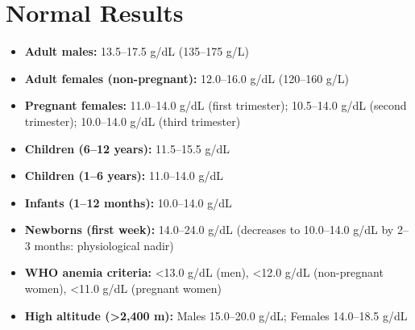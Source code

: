 \section*{Normal Results}
\begin{itemize}
  \item \textbf{Adult males:} 13.5--17.5 g/dL (135--175 g/L)
  \item \textbf{Adult females (non-pregnant):} 12.0--16.0 g/dL (120--160 g/L)
  \item \textbf{Pregnant females:} 11.0--14.0 g/dL (first trimester); 10.5--14.0 g/dL (second trimester); 10.0--14.0 g/dL (third trimester)
  \item \textbf{Children (6--12 years):} 11.5--15.5 g/dL
  \item \textbf{Children (1--6 years):} 11.0--14.0 g/dL
  \item \textbf{Infants (1--12 months):} 10.0--14.0 g/dL
  \item \textbf{Newborns (first week):} 14.0--24.0 g/dL (decreases to 10.0--14.0 g/dL by 2--3 months: physiological nadir)
  \item \textbf{WHO anemia criteria:} <13.0 g/dL (men), <12.0 g/dL (non-pregnant women), <11.0 g/dL (pregnant women)
  \item \textbf{High altitude (>2,400 m):} Males 15.0--20.0 g/dL; Females 14.0--18.5 g/dL
\end{itemize}

